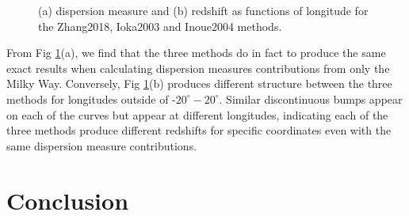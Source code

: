 \documentclass{article}
\begin{document}
\begin{figure}[!htb]
\centering
{}\hfill
{}
\caption{ (a) dispersion measure and (b) redshift as functions of longitude for the Zhang2018, Ioka2003 and Inoue2004 methods.}
\label{fig:heatplotcut}
\end{figure}

From Fig \ref{fig:heatplotcut}(a), we find that the three methods do in fact to produce the same exact results when calculating dispersion measures contributions from only the Milky Way. Conversely, Fig \ref{fig:heatplotcut}(b) produces different structure between the three methods for longitudes outside of -$20^\circ-20^\circ$. Similar discontinuous bumps appear on each of the curves but appear at different longitudes, indicating each of the three methods produce different redshifts for specific coordinates even with the same dispersion measure contributions.

\section{Conclusion}
\end{document}
